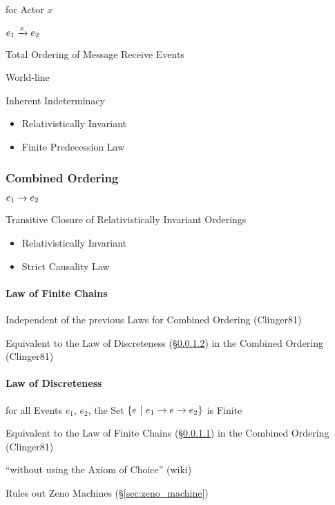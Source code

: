 for Actor $x$

$e_1 \xrightarrow{x} e_2$

Total Ordering of Message Receive Events

World-line

Inherent Indeterminacy

\begin{itemize}
  \item Relativistically Invariant
  \item Finite Predecession Law
\end{itemize}



\subsubsection{Combined Ordering}\label{sec:combined_ordering}

$e_1 \rightarrow e_2$

Transitive Closure of Relativistically Invariant Orderings

\begin{itemize}
  \item Relativistically Invariant
  \item Strict Causality Law
\end{itemize}



\paragraph{Law of Finite Chains}\label{sec:finite_chain_law}\hfill

Independent of the previous Laws for Combined Ordering (Clinger81)

Equivalent to the Law of Discreteness (\S\ref{sec:discreteness_law})
in the Combined Ordering (Clinger81)


\paragraph{Law of Discreteness}\label{sec:discreteness_law}\hfill

for all Events $e_1$, $e_2$, the Set $\{ e \ |\ e_1 \rightarrow e \rightarrow
e_2 \}$ is Finite

Equivalent to the Law of Finite Chains (\S\ref{sec:finite_chain_law})
in the Combined Ordering (Clinger81)

``without using the Axiom of Choice'' (wiki) %

\fist Rules out Zeno Machines (\S\ref{sec:zeno_machine})



